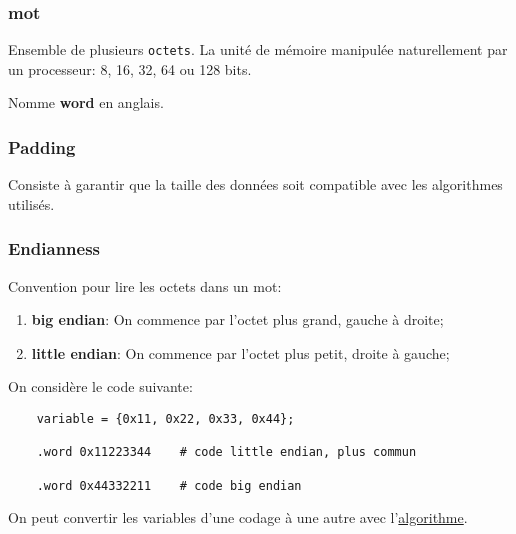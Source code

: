 \documentclass{article}
\begin{document}
\subsubsection{mot}
\begin{definition}\label{def:mot}
    Ensemble de plusieurs \texttt{octets}. La unité de mémoire manipulée naturellement par un processeur: 8, 16, 32, 64 ou 128 bits.

    \begin{remark}
        Nomme \textbf{word} en anglais.
    \end{remark}
\end{definition}

\subsubsection{Padding}
\begin{definition}\label{def:padding}
    Consiste à garantir que la taille des données soit compatible avec les algorithmes utilisés.
\end{definition}

\subsubsection{Endianness}
\begin{definition}\label{def:endianness}
    Convention pour lire les octets dans un mot:
    \begin{enumerate}[noitemsep]
        \item \textbf{big endian}: On commence par l'octet plus grand, gauche à droite;
        \item \textbf{little endian}: On commence par l'octet plus petit, droite à gauche;
    \end{enumerate}
    
    \begin{example}
        On considère le code suivante:
        \begin{scriptsize}\myRISCV
            \begin{lstlisting}
    variable = {0x11, 0x22, 0x33, 0x44};
    
    .word 0x11223344    # code little endian, plus commun
    
    .word 0x44332211    # code big endian
            \end{lstlisting}
        \end{scriptsize}
    \end{example}

    On peut convertir les variables d'une codage à une autre avec l'\href{https://codereview.stackexchange.com/questions/151049/endianness-conversion-in-c}{algorithme}.
\end{definition}
\end{document}
